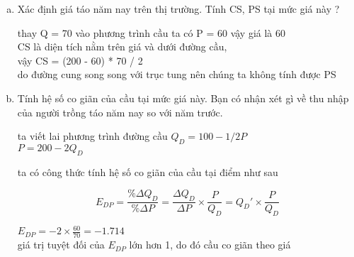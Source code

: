 \begin{enumerate}[a.]
  \item Xác định giá táo năm nay trên thị trường. Tính CS, PS tại mức giá này ?


        thay Q = 70 vào phương trình cầu ta có P = 60 vậy giá là 60 \\
        CS là diện tích nằm trên giá và dưới đường cầu, \\
         vậy CS = (200 - 60) * 70 / 2\\
        do đường cung song song với trục tung nên chúng ta không tính được PS

  \item Tính hệ số co giãn của cầu tại mức giá này. Bạn có nhận xét gì về thu nhập của
        người trồng táo năm nay so với năm trước.

        ta viết lai phương trình đường cầu $ Q_D = 100 - 1/2P$ \\
        $P = 200 - 2Q_D$

         ta có công thức tính hệ số co giãn của cầu tại điểm như sau

         \[ E_{DP} = \frac{\%\Delta Q_D}{\%\Delta P} =
         \frac{\Delta Q_D}{\Delta P} \times \frac{P}{Q_D} = Q_D' \times \frac{P}{Q_D} \]

         $E_{DP} = -2 \times \frac{60}{70} = -1.714$\\
         giá trị tuyệt đối của $E_{DP}$ lớn hơn 1, do đó cầu co giãn theo giá 



\end{enumerate}
